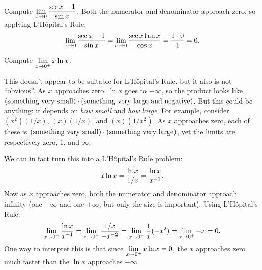 \begin{example} Compute $\displaystyle\lim_{x\to 0}{\sec x - 1\over \sin x}$.
\msk
Both the numerator and denominator approach zero, so applying 
L'H\^opital's Rule:
$$\lim_{x\to 0}{\sec x - 1\over \sin x}=
\lim_{x\to 0}{\sec x\tan x\over \cos x}={1\cdot 0\over 1}=0.$$
\vskip -16pt
\end{example}

\begin{example} Compute $\displaystyle\lim_{x\to 0^+} x\ln x$.

This doesn't appear to be suitable for L'H\^opital's Rule, but it also
is not ``obvious''. As $x$ approaches zero, $\ln x$ goes to $-\infty$,
so the product looks like $(\hbox{something very small})\cdot 
(\hbox{something very large and negative})$. But this could be
anything: it depends on {\it how small\/} and {\it how large}. 
For example, consider $(x^2)(1/x)$, $(x)(1/x)$, and $(x)(1/x^2)$. As
$x$ approaches zero, each of these is $(\hbox{something very small})\cdot 
(\hbox{something very large})$, yet the limits are respectively 
zero, $1$, and $\infty$.

We can
in fact turn this into a L'H\^opital's Rule problem:
$$x\ln x = {\ln x\over 1/x}={\ln x\over x^{-1}}.$$
Now as $x$ approaches zero, both the numerator and denominator
approach infinity (one $-\infty$ and one $+\infty$, but only the size
is important). Using  L'H\^opital's Rule:
$$\lim_{x\to 0^+} {\ln x\over x^{-1}}=
\lim_{x\to 0^+} {1/x\over -x^{-2}} =\lim_{x\to 0^+} {1\over x}(-x^2)=
\lim_{x\to 0^+} -x = 0.$$
One way to interpret this is that since $\displaystyle\lim_{x\to
  0^+}x\ln x = 0$, the $x$ approaches zero much faster than the $\ln x$
approaches $-\infty$.
\end{example}

